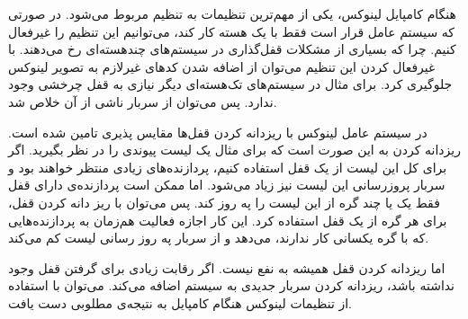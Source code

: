 هنگام کامپایل لینوکس، یکی از مهم‌ترین تنظیمات به تنظیم 
مربوط می‌شود. در صورتی که سیستم عامل قرار است فقط با یک هسته کار کند، می‌توانیم این تنظیم را غیرفعال کنیم. چرا که بسیاری از مشکلات قفل‌گذاری در سیستم‌های چندهسته‌ای رخ می‌دهند. با غیرفعال کردن این تنظیم می‌توان از اضافه شدن کدهای غیرلازم به تصویر لینوکس جلوگیری کرد. برای مثال در سیستم‌های تک‌هسته‌ای دیگر نیازی به قفل چرخشی وجود ندارد. پس می‌توان از سربار ناشی از آن خلاص شد.

در سیستم عامل لینوکس با ریزدانه 
کردن قفل‌ها مقایس پذیری تامین شده است. ریزدانه کردن به این صورت است که برای مثال یک لیست پیوندی را در نظر بگیرید. اگر برای کل این لیست از یک قفل استفاده کنیم، پردازنده‌های زیادی منتظر خواهند بود و سربار پروزرسانی این لیست نیز زیاد می‌شود. اما ممکن است پردازنده‌ی دارای قفل فقط یک یا چند گره از این لیست را په روز کند. پس می‌توان با ریز دانه کردن قفل، برای هر گره از یک قفل استفاده کرد. این کار اجازه فعالیت هم‌زمان به پردازنده‌هایی که با گره یکسانی کار ندارند، می‌دهد و از سربار په روز رسانی لیست کم می‌کند. 

اما ریزدانه کردن قفل همیشه به نفع نیست. اگر رقابت زیادی برای گرفتن قفل وجود نداشته باشد، ریزدانه کردن سربار جدیدی به سیستم اضافه می‌کند. می‌توان با استفاده از تنظیمات لینوکس هنگام کامپایل به نتیجه‌ی مطلوبی دست یافت.